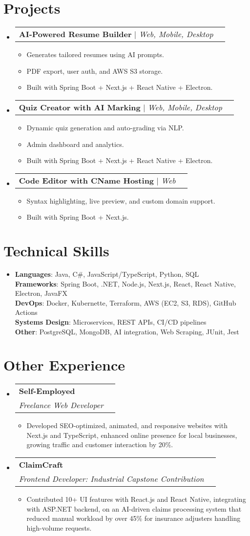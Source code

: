 \documentclass[letterpaper,11pt]{article}
\makeatletter
\newcommand{\resumeItem}[1]{
\item\small{
{#1 \vspace{-2pt}}
}
}
\newcommand{\resumeSubheading}[4]{
\vspace{-2pt}\item
\begin{tabular*}{0.97\textwidth}[t]{l@{\extracolsep{\fill}}r}
\textbf{#1} & #2 \\
\textit{\small#3} & \textit{\small #4} \\
\end{tabular*}\vspace{-7pt}
}
\newcommand{\resumeProjectHeading}[2]{
\item
\begin{tabular*}{0.97\textwidth}{l@{\extracolsep{\fill}}r}
\small#1 & #2 \\
\end{tabular*}\vspace{-7pt}
}
\newcommand{\resumeSubHeadingListStart}{\begin{itemize}[leftmargin=0.15in, label={}]}
\newcommand{\resumeSubHeadingListEnd}{\end{itemize}}
\newcommand{\resumeItemListStart}{\begin{itemize}}
\newcommand{\resumeItemListEnd}{\end{itemize}\vspace{-5pt}}
\makeatother
\begin{document}
\section{Projects}
\resumeSubHeadingListStart
\resumeProjectHeading{\textbf{AI-Powered Resume Builder} $|$ \emph{Web, Mobile, Desktop}}{}
\resumeItemListStart
\resumeItem{Generates tailored resumes using AI prompts.}
\resumeItem{PDF export, user auth, and AWS S3 storage.}
\resumeItem{Built with Spring Boot + Next.js + React Native + Electron.}
\resumeItemListEnd
\resumeProjectHeading{\textbf{Quiz Creator with AI Marking} $|$ \emph{Web, Mobile, Desktop}}{}
\resumeItemListStart
\resumeItem{Dynamic quiz generation and auto-grading via NLP.}
\resumeItem{Admin dashboard and analytics.}
\resumeItem{Built with Spring Boot + Next.js + React Native + Electron.}
\resumeItemListEnd
\resumeProjectHeading{\textbf{Code Editor with CName Hosting} $|$ \emph{Web}}{}
\resumeItemListStart
\resumeItem{Syntax highlighting, live preview, and custom domain support.}
\resumeItem{Built with Spring Boot + Next.js.}
\resumeItemListEnd
\resumeSubHeadingListEnd

\section{Technical Skills}
\begin{itemize}[leftmargin=0.15in, label={}]
\item{
\textbf{Languages}{: Java, C\#, JavaScript/TypeScript, Python, SQL} \\
\textbf{Frameworks}{: Spring Boot, .NET, Node.js, Next.js, React, React Native, Electron, JavaFX} \\
\textbf{DevOps}{: Docker, Kubernette, Terraform, AWS (EC2, S3, RDS), GitHub Actions} \\
\textbf{Systems Design}{: Microservices, REST APIs, CI/CD pipelines} \\
\textbf{Other}{: PostgreSQL, MongoDB, AI integration, Web Scraping, JUnit, Jest}
} \\
\end{itemize}

\section{Other Experience}
\resumeSubHeadingListStart
\resumeSubheading{Self-Employed}{}{Freelance Web Developer}{}
\resumeItemListStart
\resumeItem{Developed SEO-optimized, animated, and responsive websites with Next.js and TypeScript, enhanced online presence for local businesses, growing traffic and customer interaction by 20\%.}
\resumeItemListEnd
\resumeSubheading{ClaimCraft}{}{Frontend Developer: Industrial Capstone Contribution}{}
\resumeItemListStart
\resumeItem{Contributed 10+ UI features with React.js and React Native, integrating with ASP.NET backend, on an AI-driven claims processing system that reduced manual workload by over 45\% for insurance adjusters handling high-volume requests.}
\resumeItemListEnd
\resumeSubHeadingListEnd
\end{document}
